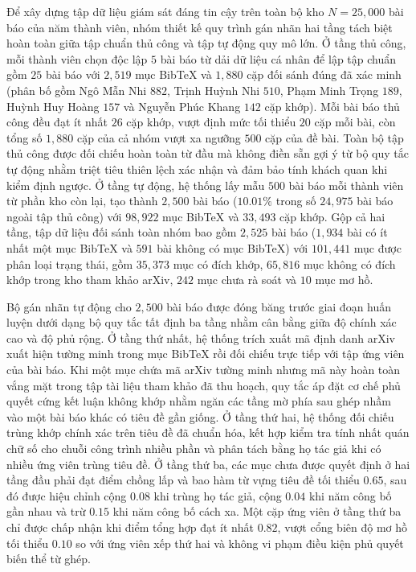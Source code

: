Để xây dựng tập dữ liệu giám sát đáng tin cậy trên toàn bộ kho $N = 25{,}000$ bài báo của năm thành viên, nhóm thiết kế quy trình gán nhãn hai tầng tách biệt hoàn toàn giữa tập chuẩn thủ công và tập tự động quy mô lớn. Ở tầng thủ công, mỗi thành viên chọn độc lập $5$ bài báo từ dải dữ liệu cá nhân để lập tập chuẩn gồm $25$ bài báo với $2{,}519$ mục BibTeX và $1{,}880$ cặp đối sánh đúng đã xác minh (phân bố gồm Ngô Mẫn Nhi $882$, Trịnh Huỳnh Nhi $510$, Phạm Minh Trọng $189$, Huỳnh Huy Hoàng $157$ và Nguyễn Phúc Khang $142$ cặp khớp). Mỗi bài báo thủ công đều đạt ít nhất $26$ cặp khớp, vượt định mức tối thiểu $20$ cặp mỗi bài, còn tổng số $1{,}880$ cặp của cả nhóm vượt xa ngưỡng $500$ cặp của đề bài. Toàn bộ tập thủ công được đối chiếu hoàn toàn từ đầu mà không điền sẵn gợi ý từ bộ quy tắc tự động nhằm triệt tiêu thiên lệch xác nhận và đảm bảo tính khách quan khi kiểm định ngược. Ở tầng tự động, hệ thống lấy mẫu $500$ bài báo mỗi thành viên từ phần kho còn lại, tạo thành $2{,}500$ bài báo ($10.01\%$ trong số $24{,}975$ bài báo ngoài tập thủ công) với $98{,}922$ mục BibTeX và $33{,}493$ cặp khớp. Gộp cả hai tầng, tập dữ liệu đối sánh toàn nhóm bao gồm $2{,}525$ bài báo ($1{,}934$ bài có ít nhất một mục BibTeX và $591$ bài không có mục BibTeX) với $101{,}441$ mục được phân loại trạng thái, gồm $35{,}373$ mục có đích khớp, $65{,}816$ mục không có đích khớp trong kho tham khảo arXiv, $242$ mục chưa rà soát và $10$ mục mơ hồ.

Bộ gán nhãn tự động cho $2{,}500$ bài báo được đóng băng trước giai đoạn huấn luyện dưới dạng bộ quy tắc tất định ba tầng nhằm cân bằng giữa độ chính xác cao và độ phủ rộng. Ở tầng thứ nhất, hệ thống trích xuất mã định danh arXiv xuất hiện tường minh trong mục BibTeX rồi đối chiếu trực tiếp với tập ứng viên của bài báo. Khi một mục chứa mã arXiv tường minh nhưng mã này hoàn toàn vắng mặt trong tập tài liệu tham khảo đã thu hoạch, quy tắc áp đặt cơ chế phủ quyết cứng kết luận không khớp nhằm ngăn các tầng mờ phía sau ghép nhầm vào một bài báo khác có tiêu đề gần giống. Ở tầng thứ hai, hệ thống đối chiếu trùng khớp chính xác trên tiêu đề đã chuẩn hóa, kết hợp kiểm tra tính nhất quán chữ số cho chuỗi công trình nhiều phần và phân tách bằng họ tác giả khi có nhiều ứng viên trùng tiêu đề. Ở tầng thứ ba, các mục chưa được quyết định ở hai tầng đầu phải đạt điểm chồng lấp và bao hàm từ vựng tiêu đề tối thiểu $0.65$, sau đó được hiệu chỉnh cộng $0.08$ khi trùng họ tác giả, cộng $0.04$ khi năm công bố gần nhau và trừ $0.15$ khi năm công bố cách xa. Một cặp ứng viên ở tầng thứ ba chỉ được chấp nhận khi điểm tổng hợp đạt ít nhất $0.82$, vượt cổng biên độ mơ hồ tối thiểu $0.10$ so với ứng viên xếp thứ hai và không vi phạm điều kiện phủ quyết biến thể từ ghép.

